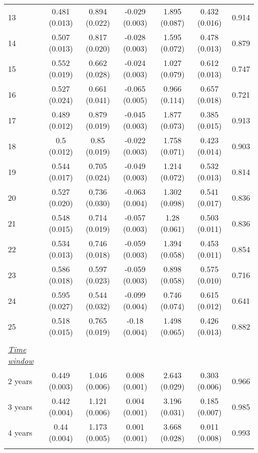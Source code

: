 \begin{tabular}{@{\extracolsep{5pt}} l cccccc}
13 & 0.481 (0.013) & 0.894 (0.022) & -0.029 (0.003) & 1.895 (0.087) & 0.432 (0.016) & 0.914 \\ 
14 & 0.507 (0.013) & 0.817 (0.020) & -0.028 (0.003) & 1.595 (0.072) & 0.478 (0.013) & 0.879 \\ 
15 & 0.552 (0.019) & 0.662 (0.028) & -0.024 (0.003) & 1.027 (0.079) & 0.612 (0.013) & 0.747 \\ 
16 & 0.527 (0.024) & 0.661 (0.041) & -0.065 (0.005) & 0.966 (0.114) & 0.657 (0.018) & 0.721 \\ 
17 & 0.489 (0.012) & 0.879 (0.019) & -0.045 (0.003) & 1.877 (0.073) & 0.385 (0.015) & 0.913 \\ 
18 & 0.5 (0.012) & 0.85 (0.019) & -0.022 (0.003) & 1.758 (0.071) & 0.423 (0.014) & 0.903 \\ 
19 & 0.544 (0.017) & 0.705 (0.024) & -0.049 (0.003) & 1.214 (0.072) & 0.532 (0.013) & 0.814 \\ 
20 & 0.527 (0.020) & 0.736 (0.030) & -0.063 (0.004) & 1.302 (0.098) & 0.541 (0.017) & 0.836 \\ 
21 & 0.548 (0.015) & 0.714 (0.019) & -0.057 (0.003) & 1.28 (0.061) & 0.503 (0.011) & 0.836 \\ 
22 & 0.534 (0.013) & 0.746 (0.018) & -0.059 (0.003) & 1.394 (0.058) & 0.453 (0.011) & 0.854 \\ 
23 & 0.586 (0.018) & 0.597 (0.023) & -0.059 (0.003) & 0.898 (0.058) & 0.575 (0.010) & 0.716 \\ 
24 & 0.595 (0.027) & 0.544 (0.032) & -0.099 (0.004) & 0.746 (0.074) & 0.615 (0.012) & 0.641 \\ 
25 & 0.518 (0.015) & 0.765 (0.019) & -0.18 (0.004) & 1.498 (0.065) & 0.426 (0.013) & 0.882 \\ 
 &   &   &   &   &   &  \\ 
\underline{{\it Time window}} &   &   &   &   &   &  \\ 
2 years & 0.449 (0.003) & 1.046 (0.006) & 0.008 (0.001) & 2.643 (0.029) & 0.303 (0.006) & 0.966 \\ 
3 years & 0.442 (0.004) & 1.121 (0.006) & 0.004 (0.001) & 3.196 (0.031) & 0.185 (0.007) & 0.985 \\ 
4 years & 0.44 (0.004) & 1.173 (0.005) & 0.001 (0.001) & 3.668 (0.028) & 0.011 (0.008) & 0.993 \\ 
\hline \\[-1.8ex] 
\end{tabular} 
